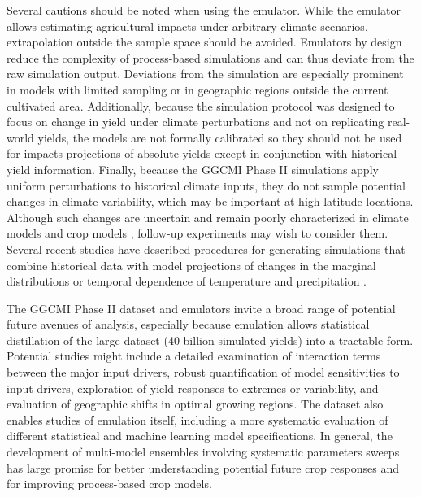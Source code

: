 \documentclass[gmd, manuscript]{copernicus} %
\begin{document}
Several cautions should be noted when using the emulator. 
While the emulator allows estimating agricultural impacts under arbitrary climate scenarios, extrapolation outside the sample space should be avoided. 
Emulators by design reduce the complexity of process-based simulations and can thus deviate from the raw simulation output. 
Deviations from the simulation are especially prominent in models with limited sampling or in geographic regions outside the current cultivated area.
Additionally, because the simulation protocol was designed to focus on change in yield under climate perturbations and not on replicating real-world yields, the models are not formally calibrated so they should not be used for impacts projections of absolute yields except in conjunction with historical yield information. 
Finally, because the GGCMI Phase II simulations apply uniform perturbations to historical climate inputs, they do not sample potential changes in climate variability, which may be important at high latitude locations.
Although such changes are uncertain and remain poorly characterized in climate models and crop models \citep[e.g.][]{Alexande2006, Kodra2014}, follow-up experiments may wish to consider them. 
Several recent studies have described procedures for generating simulations that combine historical data with model projections of changes in the marginal distributions or temporal dependence of temperature and precipitation \citep[e.g.][]{Leeds2015, poppick2016, Won16, Haugen2018}.

The GGCMI Phase II dataset and emulators invite a broad range of potential future avenues of analysis, especially because emulation allows statistical distillation of the large dataset (40 billion simulated yields) into a tractable form. 
Potential studies might include a detailed examination of interaction terms between the major input drivers, robust quantification of model sensitivities to input drivers, exploration of yield responses to extremes or variability, and evaluation of geographic shifts in optimal growing regions. 
The dataset also enables studies of emulation itself, including a more systematic evaluation of different statistical and machine learning model specifications.
In general, the development of multi-model ensembles involving systematic parameters sweeps has large promise for better understanding potential future crop responses and for improving process-based crop models.

\end{document}
